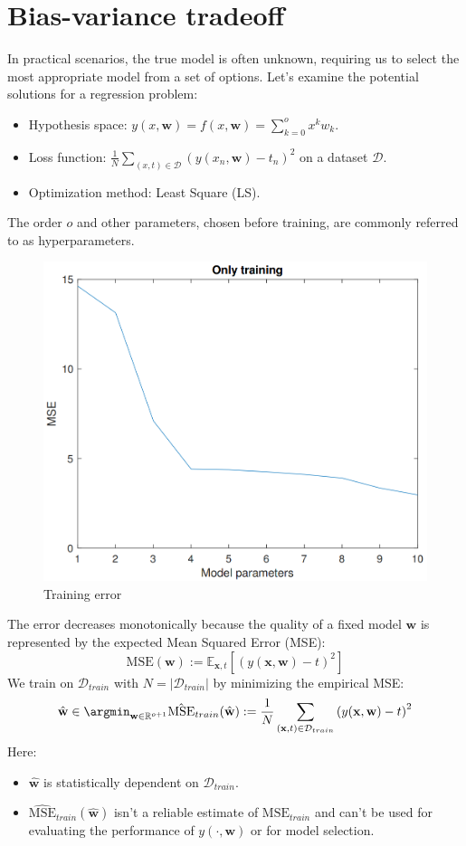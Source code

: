 \section{Bias-variance tradeoff}

In practical scenarios, the true model is often unknown, requiring us to select the most appropriate model from a set of options. 
Let's examine the potential solutions for a regression problem:
\begin{itemize}
    \item Hypothesis space: $y(x,\textbf{w})=f(x,\textbf{w})=\sum_{k=0}^{o}x^k w_k$. 
    \item Loss function: $\frac{1}{N}\sum_{(x,t)\in\mathcal{D}}{\left(y(x_n,\textbf{w})-t_n\right)}^2$ on a dataset $\mathcal{D}$. 
    \item Optimization method: Least Square (LS). 
\end{itemize}
The order $o$ and other parameters, chosen before training, are commonly referred to as hyperparameters.
\begin{figure}[H]
    \centering
    \includegraphics[width=0.5\linewidth]{images/err.png}
    \caption{Training error}
\end{figure}
The error decreases monotonically because the quality of a fixed model $\textbf{w}$ is represented by the expected Mean Squared Error (MSE):
\[\text{MSE}(\textbf{w}):=\mathbb{E}_{\textbf{x},t}\left[{\left(y(\textbf{x},\textbf{w})-t\right)}^2\right]\]
We train on $\mathcal{D}_{train}$ with $N = \left\lvert \mathcal{D}_{train} \right\rvert $ by minimizing the empirical MSE:\@
\[\hat{\textbf{w}}\in \argmin_{\textbf{w}\in\mathbb{R}^{o+1}}\hat{\text{MSE}}_{train}(\hat{\textbf{w}}):=\dfrac{1}{N}\sum_{(\textbf{x},t)\in\mathcal{D}_{train}}{\left(y(\textbf{x},\textbf{w})-t\right)}^2\]
Here: 
\begin{itemize}
    \item $\hat{\textbf{w}}$ is statistically dependent on $\mathcal{D}_{train}$. 
    \item $\hat{\text{MSE}}_{train}(\hat{\textbf{w}})$ isn't a reliable estimate of $\text{MSE}_{train}$ and can't be used for evaluating the performance of $y(\cdot,\textbf{w})$ or for model selection.
\end{itemize}
